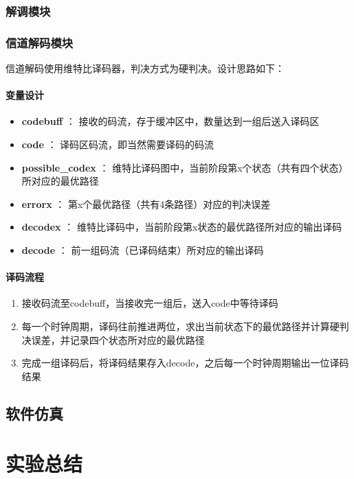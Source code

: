 \documentclass[UTF8]{ctexart}
\begin{document}
\subsubsection{解调模块}

\subsubsection{信道解码模块}

信道解码使用维特比译码器，判决方式为硬判决。设计思路如下：

\paragraph{变量设计}

\begin{itemize}
\item \textbf{codebuff} ： 接收的码流，存于缓冲区中，数量达到一组后送入译码区
\item \textbf{code} ： 译码区码流，即当然需要译码的码流
\item \textbf{possible\_codex} ： 维特比译码图中，当前阶段第x个状态（共有四个状态）所对应的最优路径
\item \textbf{errorx} ： 第x个最优路径（共有4条路径）对应的判决误差
\item \textbf{decodex} ： 维特比译码中，当前阶段第x状态的最优路径所对应的输出译码
\item \textbf{decode} ： 前一组码流（已译码结束）所对应的输出译码
\end{itemize}

\paragraph{译码流程}

\begin{enumerate}
\item 接收码流至codebuff，当接收完一组后，送入code中等待译码
\item 每一个时钟周期，译码往前推进两位，求出当前状态下的最优路径并计算硬判决误差，并记录四个状态所对应的最优路径
\item 完成一组译码后，将译码结果存入decode，之后每一个时钟周期输出一位译码结果
\end{enumerate}

\subsection{软件仿真}

\section{实验总结}
\end{document}
